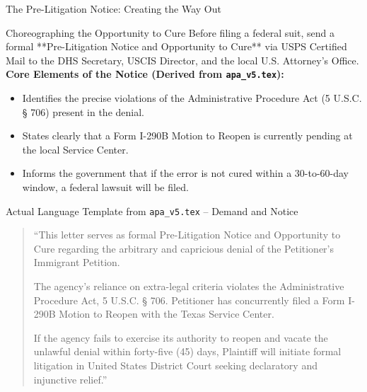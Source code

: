 \documentclass[11pt]{beamer}
\begin{document}
	\begin{frame}[allowframebreaks]{The Pre-Litigation Notice: Creating the Way Out}
		\scriptsize
		\begin{block}{Choreographing the Opportunity to Cure}
			Before filing a federal suit, send a formal **Pre-Litigation Notice and Opportunity to Cure** via USPS Certified Mail to the DHS Secretary, USCIS Director, and the local U.S. Attorney's Office.
			\vspace{0.15cm}
			\textbf{Core Elements of the Notice (Derived from \texttt{apa\_v5.tex}):}
			\begin{itemize}
				\item Identifies the precise violations of the Administrative Procedure Act (5 U.S.C. § 706) present in the denial.
				\item States clearly that a Form I-290B Motion to Reopen is currently pending at the local Service Center.
				\item Informs the government that if the error is not cured within a 30-to-60-day window, a federal lawsuit will be filed.
			\end{itemize}
		\end{block}
		\framebreak
		\begin{block}{Actual Language Template from \texttt{apa\_v5.tex} -- Demand and Notice}
			\begin{quote}
				``This letter serves as formal Pre-Litigation Notice and Opportunity to Cure regarding the arbitrary and capricious denial of the Petitioner’s Immigrant Petition. 
				
				The agency’s reliance on extra-legal criteria violates the Administrative Procedure Act, 5 U.S.C. § 706. Petitioner has concurrently filed a Form I-290B Motion to Reopen with the Texas Service Center. 
				
				If the agency fails to exercise its authority to reopen and vacate the unlawful denial within forty-five (45) days, Plaintiff will initiate formal litigation in United States District Court seeking declaratory and injunctive relief.''
			\end{quote}
		\end{block}
	\end{frame}
	
\end{document}
